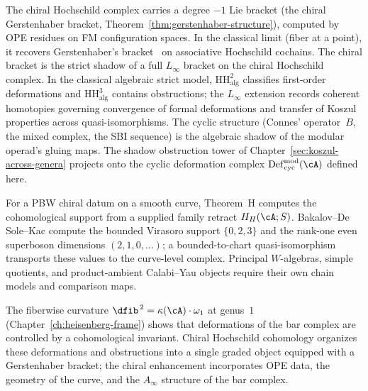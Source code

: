 The chiral Hochschild complex carries a degree $-1$ Lie bracket
(the chiral Gerstenhaber bracket, Theorem~\ref{thm:gerstenhaber-structure}),
computed by OPE residues on FM configuration spaces.
In the classical limit (fiber at a point), it recovers
Gerstenhaber's bracket~\cite{Ger63} on associative Hochschild
cochains. The chiral bracket is the strict shadow of a full
$L_\infty$ bracket on the chiral Hochschild complex. In the
classical algebraic strict model,
$\mathrm{HH}^2_{\mathrm{alg}}$ classifies first-order
deformations and $\mathrm{HH}^3_{\mathrm{alg}}$ contains
obstructions;
the $L_\infty$ extension records coherent homotopies governing
convergence of formal deformations and transfer of Koszul properties
across quasi-isomorphisms. The cyclic structure (Connes'
operator~$B$, the mixed complex, the SBI sequence) is the algebraic
shadow of the modular operad's gluing maps. The shadow obstruction
tower of Chapter~\ref{sec:koszul-across-genera} projects onto the
cyclic deformation complex
$\mathrm{Def}_{\mathrm{cyc}}^{\mathrm{mod}}(\cA)$ defined here.

For a PBW chiral datum on a smooth curve, Theorem~H computes the
cohomological support from a supplied family retract
$H_H(\cA;S)$.  Bakalov--De Sole--Kac compute the bounded Virasoro
support $\{0,2,3\}$ and the rank-one even superboson dimensions
$(2,1,0,\ldots)$; a bounded-to-chart quasi-isomorphism transports
these values to the curve-level complex.  Principal $W$-algebras,
simple quotients, and product-ambient Calabi--Yau objects require
their own chain models and comparison maps.

The fiberwise curvature $\dfib^{\,2} = \kappa(\cA) \cdot \omega_1$ at
genus~$1$ (Chapter~\ref{ch:heisenberg-frame}) shows that deformations
of the bar complex are controlled by a cohomological invariant.
Chiral Hochschild cohomology organizes these deformations and obstructions
into a single graded object equipped with a Gerstenhaber bracket;
the chiral enhancement incorporates OPE data, the geometry of the
curve, and the $A_\infty$ structure of the bar complex.


